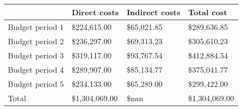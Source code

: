 \begin{tabular}{llll}
\hline
{} &   Direct costs & Indirect costs &     Total cost \\
\hline
Budget period 1 &    \$224,615.00 &     \$65,021.85 &    \$289,636.85 \\
Budget period 2 &    \$236,297.00 &     \$69,313.23 &    \$305,610.23 \\
Budget period 3 &    \$319,117.00 &     \$93,767.54 &    \$412,884.54 \\
Budget period 4 &    \$289,907.00 &     \$85,134.77 &    \$375,041.77 \\
Budget period 5 &    \$234,133.00 &     \$65,289.00 &    \$299,422.00 \\\hline
Total           &  \$1,304,069.00 &           \$nan &  \$1,304,069.00 \\
\hline
\end{tabular}
